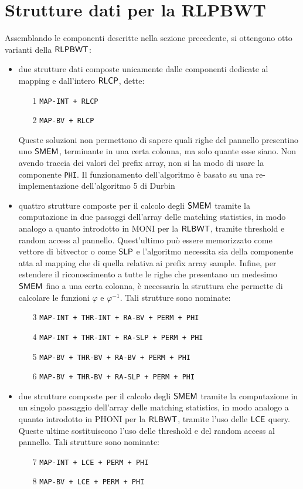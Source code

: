 \section{Strutture dati per la RLPBWT}
Assemblando le componenti descritte nella sezione precedente, si ottengono otto
varianti della $\mbox{\rm {\sf RLPBWT}}$:
\begin{itemize}
  \item due strutture dati composte unicamente dalle componenti dedicate al
  mapping e dall'intero $\mbox{\rm {\sf RLCP}}$, dette:
  \begin{enumerate}
    \item[1] \texttt{MAP-INT + RLCP}
    \item[2] \texttt{MAP-BV + RLCP}
  \end{enumerate}
  Queste soluzioni non permettono di sapere quali righe del pannello
  presentino uno $\mbox{\rm {\sf SMEM}}$, terminante in una certa colonna, ma solo quante
  esse siano. Non avendo traccia dei valori del prefix array, non si ha modo di
  usare la componente \texttt{PHI}. Il funzionamento dell'algoritmo è basato su
  una re-implementazione 
  dell'algoritmo 5 di Durbin
  \item quattro strutture composte per il calcolo degli $\mbox{\rm {\sf SMEM}}$ tramite la
  computazione 
  in due passaggi dell'array delle matching statistics, in modo analogo
  a quanto introdotto in MONI \cite{moni} per la $\mbox{\rm {\sf RLBWT}}$, tramite
  threshold e random access al pannello. Quest'ultimo può essere memorizzato
  come vettore di bitvector o come 
  $\mbox{\rm {\sf SLP}}$ e l'algoritmo  
  necessita sia della componente atta al mapping che di quella
  relativa ai prefix array sample. Infine, per estendere il
  riconoscimento a tutte le righe che presentano un medesimo $\mbox{\rm {\sf SMEM}}$ fino a una
  certa colonna, è necessaria la struttura che permette di calcolare le
  funzioni $\varphi$ e $\varphi^{-1}$. Tali strutture sono nominate:
  \begin{enumerate}
    \item[3] \texttt{MAP-INT + THR-INT + RA-BV + PERM + PHI}
    \item[4] \texttt{MAP-INT + THR-INT + RA-SLP + PERM + PHI}
    \item[5] \texttt{MAP-BV + THR-BV + RA-BV + PERM + PHI}
    \item[6] \texttt{MAP-BV + THR-BV + RA-SLP + PERM + PHI}
  \end{enumerate}
  \item due strutture composte per il calcolo degli $\mbox{\rm {\sf SMEM}}$ tramite la
  computazione 
  in un singolo passaggio dell'array delle matching statistics, in modo
  analogo a quanto introdotto in PHONI \cite{phoni} per la $\mbox{\rm {\sf RLBWT}}$, tramite
  l'uso delle $\mbox{\rm {\sf LCE}}$ query. Queste ultime sostituiscono l'uso delle
  threshold e del random access al pannello. Tali strutture
  sono nominate: 
  \begin{enumerate}
    \item[7] \texttt{MAP-INT + LCE + PERM + PHI}
    \item[8] \texttt{MAP-BV + LCE + PERM + PHI}
  \end{enumerate}
\end{itemize}
